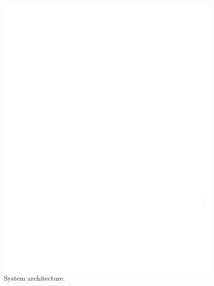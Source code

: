 \documentclass[journal]{IEEEtran}
\begin{document}
\begin{figure}[h]
    \centering
    \begin{minipage}{0.45\textwidth}
        \centering
        \includegraphics[page=2,width=\textwidth
        ,trim=0.6cm 4.4cm 0.6cm 1.0cm, clip
        ]{Diagrams/New_system_model.drawio (1) (1).pdf}
        \caption{System architecture.}
        \label{fig:model}
    \end{minipage}
    \hfill
    \begin{minipage}{0.45\textwidth}
        \centering

\end{minipage}
\end{figure}
\end{document}
